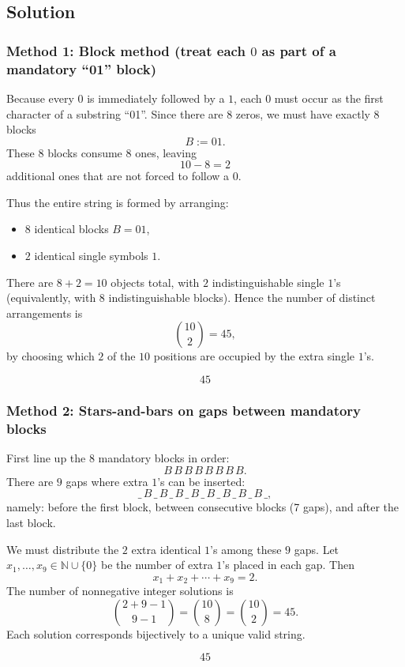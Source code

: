 \documentclass[12pt]{article}
\newcommand{\N}{\mathbb{N}}
\begin{document}
\subsection{Solution}

\subsubsection{Method 1: Block method (treat each $0$ as part of a mandatory ``01'' block)}
Because every $0$ is immediately followed by a $1$, each $0$ must occur as the first character of a substring ``01''. Since there are $8$ zeros, we must have exactly $8$ blocks
\[
B := 01.
\]
These $8$ blocks consume $8$ ones, leaving
\[
10-8=2
\]
additional ones that are not forced to follow a $0$.

Thus the entire string is formed by arranging:
\begin{itemize}[leftmargin=*]
\item $8$ identical blocks $B=01$,
\item $2$ identical single symbols $1$.
\end{itemize}
There are $8+2=10$ objects total, with $2$ indistinguishable single $1$'s (equivalently, with $8$ indistinguishable blocks). Hence the number of distinct arrangements is
\[
\binom{10}{2}=45,
\]
by choosing which $2$ of the $10$ positions are occupied by the extra single $1$'s.

\[
\boxed{45}
\]

\subsubsection{Method 2: Stars-and-bars on gaps between mandatory blocks}
First line up the $8$ mandatory blocks in order:
\[
B\,B\,B\,B\,B\,B\,B\,B.
\]
There are $9$ gaps where extra $1$'s can be inserted:
\[
\_\,B\,\_\,B\,\_\,B\,\_\,B\,\_\,B\,\_\,B\,\_\,B\,\_\,B\,\_,
\]
namely: before the first block, between consecutive blocks (7 gaps), and after the last block.

We must distribute the $2$ extra identical $1$'s among these $9$ gaps. Let $x_1,\dots,x_9\in\N\cup\{0\}$ be the number of extra $1$'s placed in each gap. Then
\[
x_1+x_2+\cdots+x_9=2.
\]
The number of nonnegative integer solutions is
\[
\binom{2+9-1}{9-1}=\binom{10}{8}=\binom{10}{2}=45.
\]
Each solution corresponds bijectively to a unique valid string.

\[
\boxed{45}
\]

\newpage

\end{document}
